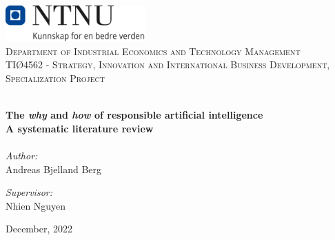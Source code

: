 
\begin{titlepage}
\vbox{ }
\vbox{ }
\begin{center}
\includegraphics[width=0.40\textwidth]{Images/NTNU_logo.png}\\[1cm]
\textsc{\LARGE Department of Industrial Economics and Technology Management}\\[1.5cm]
\textsc{\Large TIØ4562 - Strategy, Innovation and International Business Development, Specialization Project}\\[0.5cm]
\vbox{ }

\HRule \\[0.4cm]
{ \huge \bfseries The \textit{why} and \textit{how} of responsible artificial intelligence}\\[0.4cm]
{ \LARGE \bfseries A systematic literature review}\\[0.4cm]
\HRule \\[1.5cm]

\large
\emph{Author:}\\
Andreas Bjelland Berg

\emph{Supervisor:}\\
Nhien Nguyen
\vfill

{\large December, 2022}
\end{center}
\end{titlepage}